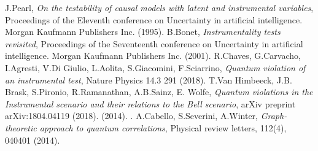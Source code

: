\documentclass{article}
\begin{document}
\begin{thebibliography}{}
     J.Pearl, {\em On the testability of causal models with
        latent and instrumental variables}, 
        Proceedings of the Eleventh conference on Uncertainty in artificial
        intelligence. Morgan Kaufmann Publishers Inc. (1995).
     B.Bonet, {\em Instrumentality tests revisited},
        Proceedings of the Seventeenth conference on Uncertainty in artificial
        intelligence. Morgan Kaufmann Publishers Inc. (2001).
     R.Chaves, G.Carvacho, I.Agresti, V.Di Giulio, L.Aolita,
        S.Giacomini, F.Sciarrino, 
        {\em Quantum violation of an instrumental test}, 
        Nature Physics 14.3 291 (2018).
      T.Van Himbeeck, J.B. Brask, S.Pironio, R.Ramanathan, A.B.Sainz, E. Wolfe, 
        {\em Quantum violations in the Instrumental scenario and their relations to the Bell scenario},
        arXiv preprint arXiv:1804.04119 (2018).
         (2014). . 
      A.Cabello, S.Severini, A.Winter,
         {\em Graph-theoretic approach to quantum correlations}, 
         Physical review letters, 112(4), 040401 (2014).
\end{thebibliography}
\end{document}
